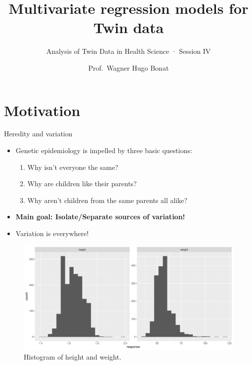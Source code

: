\documentclass[
  ignorenonframetext,
  serif,
  professionalfont,
  usenames,
  dvipsnames,
  aspectratio = 169]{beamer}
\title{Multivariate regression models for Twin data}
\subtitle{Analysis of Twin Data in Health Science · Session IV}
\author{Prof.~Wagner Hugo Bonat}
\date{}
\institute{Ômega Data Science \textbar{} Online School of Data Science}
\providecommand{\tightlist}{%
  \setlength{\itemsep}{0pt}\setlength{\parskip}{0pt}}
\renewcommand{\tightlist}{%
  \setlength{\itemsep}{0\baselineskip}
  \setlength{\parskip}{0.25\baselineskip}
}
\def\beginAHalfColumn{\begin{minipage}{0.49\textwidth}}%
\def\endColumns{\end{minipage}}%
\begin{document}
\frame{\titlepage}

\hypertarget{motivation}{%
\section{Motivation}\label{motivation}}

\begin{frame}{Heredity and variation}
\protect\hypertarget{heredity-and-variation}{}
\beginAHalfColumn

\begin{itemize}
\tightlist
\item
  Genetic epidemiology is impelled by three basic questions:

  \begin{enumerate}
  \tightlist
  \item
    Why isn't everyone the same?
  \item
    Why are children like their parents?
  \item
    Why aren't children from the same parents all alike?
  \end{enumerate}
\item
  \textbf{Main goal: Isolate/Separate sources of variation!}
\end{itemize}

\endColumns
\beginAHalfColumn

\begin{itemize}
\tightlist
\item
  Variation is everywhere!
\end{itemize}

\begin{figure}

{\centering \includegraphics[width=1\linewidth]{Slides_files/figure-beamer/unnamed-chunk-2-1} 

}

\caption{Histogram of height and weight.}\label{fig:unnamed-chunk-2}
\end{figure}

\endColumns
\end{frame}
\end{document}
